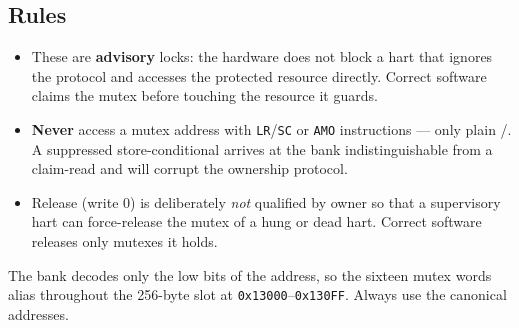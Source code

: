 \subsection{Rules}

\begin{itemize}
	\item These are \textbf{advisory} locks: the hardware does not block a hart that ignores the protocol and accesses the protected resource directly. Correct software claims the mutex before touching the resource it guards.
	\item \textbf{Never} access a mutex address with \texttt{LR}/\texttt{SC} or \texttt{AMO} instructions --- only plain /. A suppressed store-conditional arrives at the bank indistinguishable from a claim-read and will corrupt the ownership protocol.
	\item Release (write 0) is deliberately \textit{not} qualified by owner so that a supervisory hart can force-release the mutex of a hung or dead hart. Correct software releases only mutexes it holds.
\end{itemize}

The bank decodes only the low bits of the address, so the sixteen mutex words alias throughout the 256-byte slot at \texttt{0x13000}--\texttt{0x130FF}. Always use the canonical addresses.
